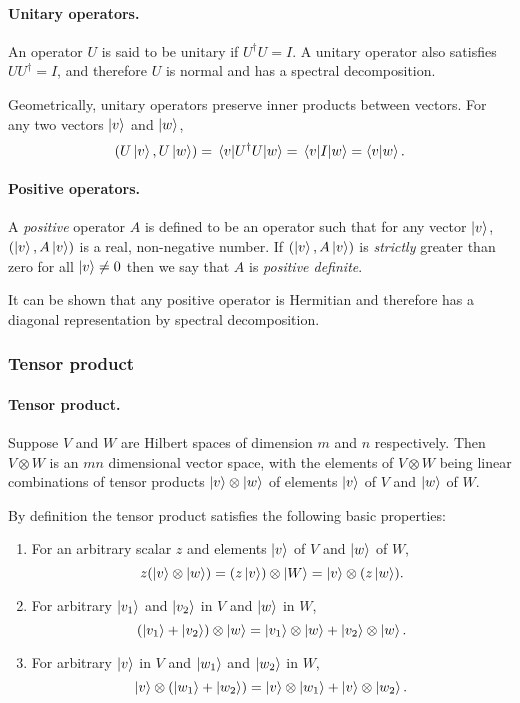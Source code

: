 \documentclass{article}
\numberwithin{theorem}{section}
\numberwithin{corollary}{section}
\begin{document}
\paragraph{Unitary operators.} An operator $U$ is said to be unitary if
$U^{\dagger}U = I$. A unitary operator also satisfies $UU^{\dagger} = I$, and
therefore $U$ is normal and has a spectral decomposition.

Geometrically, unitary operators preserve inner products between vectors. For
any two vectors $\ket{v}$ and $\ket{w}$, \[
  (U\ket{v}, U\ket{w}) = \mel{v}{U^{\dagger}U}{w} = \mel{v}{I}{w} =
  \ip{v}{w}.
\]

\paragraph{Positive operators.} A \emph{positive} operator $A$ is defined to be
an operator such that for any vector $\ket{v}$, $(\ket{v}, A\ket{v})$ is a
real, non-negative number. If $(\ket{v}, A\ket{v})$ is \emph{strictly} greater
than zero for all $\ket{v} \neq 0$ then we say that $A$ is \emph{positive
definite}.

It can be shown that any positive operator is Hermitian and therefore has a
diagonal representation by spectral decomposition.

\subsubsection{Tensor product}

\paragraph{Tensor product.} Suppose $V$ and $W$ are Hilbert spaces of dimension
$m$ and $n$ respectively. Then $V \otimes W$ is an $mn$ dimensional vector
space, with the elements of $V \otimes W$ being linear combinations of tensor
products $\ket{v} \otimes \ket{w}$ of elements $\ket{v}$ of $V$ and $\ket{w}$
of $W$.

By definition the tensor product satisfies the following basic properties:
\begin{enumerate}
  \item For an arbitrary scalar $z$ and elements $\ket{v}$ of $V$ and $\ket{w}$
    of $W$, \[
      z(\ket{v} \otimes \ket{w}) = (z\ket{v}) \otimes \ket{W} = \ket{v} \otimes
      (z\ket{w}).
    \]
  \item For arbitrary $\ket{v_1}$ and $\ket{v_2}$ in $V$ and $\ket{w}$ in $W$,
    \[
      (\ket{v_1} + \ket{v_2}) \otimes \ket{w} = \ket{v_1} \otimes \ket{w} +
      \ket{v_2} \otimes \ket{w}.
    \]
  \item For arbitrary $\ket{v}$ in $V$ and $\ket{w_1}$ and $\ket{w_2}$ in $W$,
    \[
      \ket{v} \otimes (\ket{w_1} + \ket{w_2}) = \ket{v} \otimes \ket{w_1} +
      \ket{v} \otimes \ket{w_2}.
    \]
\end{enumerate}
\end{document}
